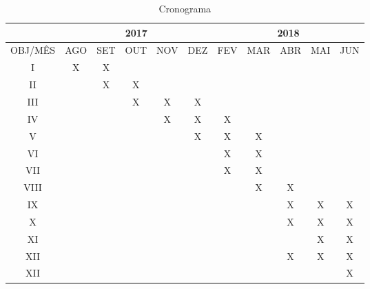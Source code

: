 \documentclass[
	12pt,				%
	openright,			%
	oneside,			%
	a4paper,			%
	english,			%
	french,				%
	spanish,			%
	brazil,				%
	]{abntex2}
\begin{document}
\begin{table}[h!]
	\centering
	\caption{Cronograma}
	\label{my-label}
	\begin{tabular}{c|c|c|c|c|c|c|c|c|c|c|}
		\cline{2-11}
		& \multicolumn{5}{c|}{2017}   & \multicolumn{5}{c|}{2018}   \\ \hline
		\multicolumn{1}{|c|}{OBJ/MÊS} & AGO & SET & OUT & NOV & DEZ & FEV & MAR & ABR & MAI & JUN \\ \hline
		\multicolumn{1}{|c|}{I}		&X&X& & & & & & & &\\ \hline
		\multicolumn{1}{|c|}{II}	& &X&X& & & & & & &\\ \hline
		\multicolumn{1}{|c|}{III}	& & &X&X&X& & & & &\\ \hline
		\multicolumn{1}{|c|}{IV}	& & & &X&X&X& & & &\\ \hline
		\multicolumn{1}{|c|}{V}		& & & & &X&X&X& & &\\ \hline
		\multicolumn{1}{|c|}{VI}	& & & & & &X&X& & &\\ \hline
		\multicolumn{1}{|c|}{VII}	& & & & & &X&X& & &\\ \hline
		\multicolumn{1}{|c|}{VIII}	& & & & & & &X&X& &\\ \hline
		\multicolumn{1}{|c|}{IX}	& & & & & & & &X&X&X\\ \hline
		\multicolumn{1}{|c|}{X}		& & & & & & & &X&X&X\\ \hline
		\multicolumn{1}{|c|}{XI}	& & & & & & & & &X&X\\ \hline
		\multicolumn{1}{|c|}{XII}	& & & & & & & &X&X&X\\ \hline
		\multicolumn{1}{|c|}{XII}	& & & & & & & & & &X\\ \hline
	\end{tabular}
\end{table}


\end{document}
